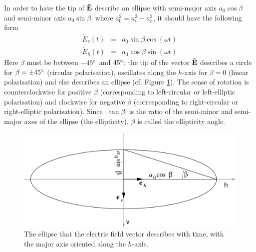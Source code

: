 In order to have the tip of $\mathbf{\tilde{E}}$ describe an ellipse with semi-major axis $a_0 \cos\beta$
and
semi-minor axis $a_0 \sin\beta$, where $a_0^2 = a_v^2 + a_h^2$, 
it should have the following form
\begin{eqnarray}
  \label{eq:polarization:ellipse_parallel}
 \tilde{E}_v (t) &=&   a_0 \sin\beta \cos(\omega t)\\
 \tilde{E}_h (t) &=&   a_0 \cos\beta \sin(\omega t)
\end{eqnarray}
Here $\beta$ must be between $-45^\circ$ and $45^\circ$: the tip of
the vector $\mathbf{\tilde{E}}$ describes a circle for $\beta = \pm
45^\circ$ (circular polarisation), oscillates along the $h$-axis for
$\beta = 0$ (linear polarisation) and else describes an ellipse (cf.
Figure \ref{fig:polarization:ellipse_aligned}). The sense of rotation
is counterclockwise for positive $\beta$ (corresponding to left-circular
or left-elliptic polarisation) and clockwise for negative
$\beta$ (corresponding to right-circular
or right-elliptic polarisation).
Since $|\tan\beta|$ is the ratio of the semi-minor and semi-major axes
of the ellipse (the ellipticity), $\beta$ is called the ellipticity
angle.\label{def:ellipticity-angle}
\begin{figure}
 \begin{center}
  \begin{minipage}[c]{0.9\textwidth}
   \begin{center}
    \includegraphics*[width=0.9\hsize]{pol_ellipse_aligned}
   \end{center}
  \end{minipage}
  \begin{minipage}[c]{0.9\textwidth}
   \caption{The ellipse that the electric field vector describes with
     time, with the major axis oriented along the $h$-axis.}
   \label{fig:polarization:ellipse_aligned}
  \end{minipage}
 \end{center}
\end{figure}   
